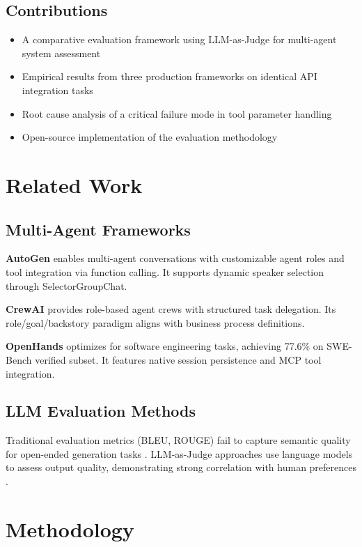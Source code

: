 \documentclass[11pt,a4paper]{article}
\begin{document}
\subsection{Contributions}

\begin{itemize}
    \item A comparative evaluation framework using LLM-as-Judge for multi-agent system assessment
    \item Empirical results from three production frameworks on identical API integration tasks
    \item Root cause analysis of a critical failure mode in tool parameter handling
    \item Open-source implementation of the evaluation methodology
\end{itemize}

\section{Related Work}

\subsection{Multi-Agent Frameworks}

\textbf{AutoGen} \citep{wu2023autogen} enables multi-agent conversations with customizable agent roles and tool integration via function calling. It supports dynamic speaker selection through SelectorGroupChat.

\textbf{CrewAI} provides role-based agent crews with structured task delegation. Its role/goal/backstory paradigm aligns with business process definitions.

\textbf{OpenHands} \citep{openhands2024} optimizes for software engineering tasks, achieving 77.6\% on SWE-Bench verified subset. It features native session persistence and MCP tool integration.

\subsection{LLM Evaluation Methods}

Traditional evaluation metrics (BLEU, ROUGE) fail to capture semantic quality for open-ended generation tasks \citep{liu2023geval}. LLM-as-Judge approaches use language models to assess output quality, demonstrating strong correlation with human preferences \citep{zheng2023judging}.

\section{Methodology}
\end{document}

